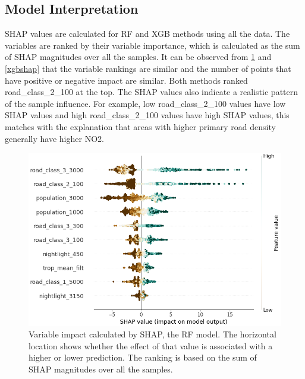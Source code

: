 \documentclass{article}
\begin{document}
\subsection{Model Interpretation} 

SHAP values are calculated for RF and XGB methods using all the data. The variables are ranked by their variable importance, which is calculated as the sum of SHAP magnitudes over all the samples. It can be observed from \cref{rfshap} and \cref{xgbshap} that the variable rankings are similar and the number of points that have positive or negative impact are similar. Both methods ranked road\_class\_2\_100 at the top. The SHAP values also indicate a realistic pattern of the sample influence. For example, low  road\_class\_2\_100 values have low SHAP values and high road\_class\_2\_100 values have high SHAP values, this matches with the explanation that areas with higher primary road density generally have higher NO2.

\begin{figure}
\centering
\includegraphics[scale = 0.5]{fig/rfshap.png}
\caption{Variable impact calculated by SHAP, the RF model. The horizontal location shows whether the effect of that value is associated with a higher or lower prediction. The ranking is based on the sum of SHAP magnitudes over all the samples.}
\label{rfshap}
\end{figure}
\end{document}
